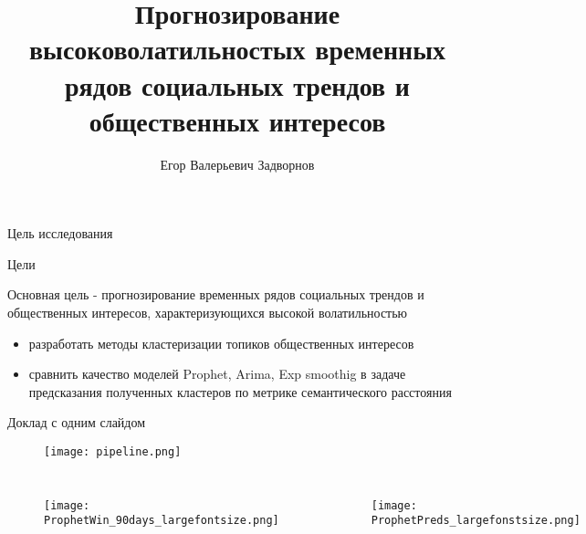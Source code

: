 \documentclass{beamer}
\title[Прогнозирование высоковолатильностых временных рядов социальных трендов и общественных интересов]{Прогнозирование высоковолатильностых временных рядов социальных трендов и общественных интересов}
\author[Е.\,В. Задворнов]{Егор Валерьевич Задворнов}
\institute{Московский физико-технический институт}
\date{\footnotesize
\par\smallskip\emph{Курс:} Автоматизация научных исследований\par (практика, В.\,В.~Стрижов)/Группа 128
\par\smallskip\emph{Эксперт:} А.\,С.~Малков
\par\smallskip\emph{Консультант:} А.\,В.~Мацейко
\par\bigskip\small 2024}
\begin{document}
\begin{frame}
\thispagestyle{empty}
\maketitle
\end{frame}
\begin{frame}{Цель исследования}
     \begin{block}{Цели}

     Основная цель - прогнозирование временных рядов социальных трендов и общественных интересов, характеризующихся высокой волатильностью
     
     \begin{itemize}
         \item разработать методы кластеризации топиков общественных интересов
         \item сравнить качество моделей Prophet, Arima, Exp smoothig в задаче предсказания полученных кластеров по метрике семантического расстояния
     \end{itemize}
     \end{block}

 \end{frame}

\begin{frame}{Доклад с одним слайдом}


\begin{figure}
\texttt{[image: pipeline.png]}
\end{figure}
\begin{columns}[c]




\begin{figure}
\texttt{[image: ProphetWin\_90days\_largefontsize.png]}
\end{figure}



\begin{figure}
\texttt{[image: ProphetPreds\_largefonstsize.png]}
\end{figure}
\end{columns}
\end{frame}
\end{document}
